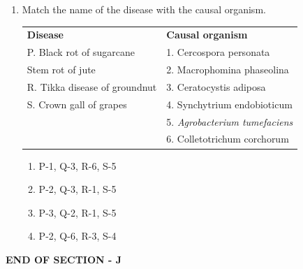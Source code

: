 \documentclass[journal,12pt,onecolumn]{IEEEtran}
\begin{document}
\begin{enumerate}[label=\arabic*.]
\item Match the name of the disease with the causal organism.
\begin{center}
\begin{tabular}{p{6cm}p{7cm}}
\textbf{Disease} & \textbf{Causal organism} \\
P. Black rot of sugarcane & 1. Cercospora personata \\
 Stem rot of jute & 2. Macrophomina phaseolina \\
R. Tikka disease of groundnut & 3. Ceratocystis adiposa \\
S. Crown gall of grapes & 4. Synchytrium endobioticum \\
 & 5. \textit{Agrobacterium tumefaciens} \\
 & 6. Colletotrichum corchorum \\
\end{tabular}
\end{center}
\begin{multicols}{2}
\begin{enumerate}[label=(\Alph*)]
\item P-1, Q-3, R-6, S-5
\item P-2, Q-3, R-1, S-5
\item P-3, Q-2, R-1, S-5
\item P-2, Q-6, R-3, S-4
\end{enumerate}
\end{multicols}

\end{enumerate}

\begin{center}
\textbf{END OF SECTION - J}
\end{center}
\newpage
\end{document}
